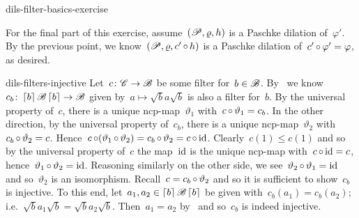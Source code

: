 \begin{solution}{dils-filter-basics-exercise}
\begin{enumerate}
For the final part of this exercise, assume~$(\mathscr{P}, \varrho, h)$
    is a Paschke dilation of~$\varphi'$.
By the previous point,
    we know~$(\mathscr{P}, \varrho, c' \mathop{\circ} h)$
        is a Paschke dilation of~$c' \mathop{\circ} \varphi' = \varphi$,
        as desired.
\end{enumerate}
\end{solution}
\begin{solution}{dils-filters-injective}%
Let~$c\colon \mathscr{C} \to \mathscr{B}$ be some filter for~$b \in \mathscr{B}$.
    By~
        we know~$c_b\colon \left\lceil b\right\rceil \mathscr{B} \left\lceil b\right\rceil \to \mathscr{B}$
            given by~$a \mapsto \sqrt{b} a \sqrt{b}$
                is also a filter for~$b$.
    By the universal property of~$c$,
        there is a unique ncp-map~$\vartheta_1$
            with~$c \mathop{\circ} \vartheta_1 = c_b$.
    In the other direction, by the universal property of~$c_b$,
        there is a unique ncp-map~$\vartheta_2$
            with~$c_b \mathop{\circ} \vartheta_2 = c$.
    Hence~$c \mathop{\circ} (\vartheta_1 \mathop{\circ} \vartheta_2)
            = c_b \mathop{\circ} \vartheta_2 = c \mathop{\circ} \mathrm{id}$.
Clearly~$c(1) \leq c(1)$
    and so by the universal property of~$c$
    the map~$\mathrm{id}$ is the unique ncp-map
    with~$c \mathop{\circ} \mathrm{id} = c$, hence~$\vartheta_1 \mathop{\circ} \vartheta_2 = \mathrm{id}$.
Reasoning similarly on the other side,
    we see~$\vartheta_2 \mathop{\circ} \vartheta_1 = \mathrm{id}$
    and so~$\vartheta_2$ is an isomorphism.
Recall~$c = c_b \mathop{\circ} \vartheta_2$
    and so it is sufficient to show~$c_b$ is injective.
    To this end, let~$a_1,a_2 \in \left\lceil b\right\rceil \mathscr{B} \left\lceil b\right\rceil$ be given
    with~$c_b(a_1) = c_b(a_2)$;
    i.e.~$\sqrt{b}a_1\sqrt{b} = \sqrt{b}a_2\sqrt{b}$.
    Then~$a_1 = a_2$ by~
        and so~$c_b$ is indeed injective.
\end{solution}
